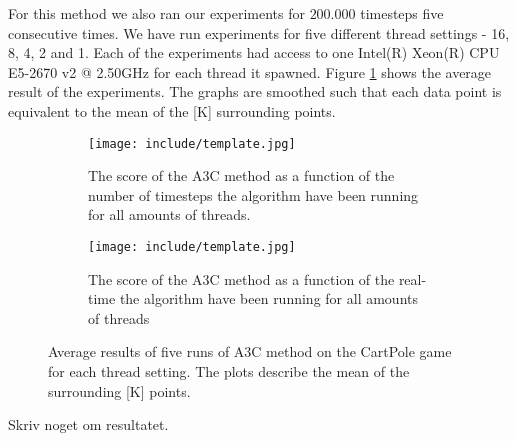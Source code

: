 \documentclass[11pt]{article}
\begin{document}
For this method we also ran our experiments for $200.000$ timesteps
five consecutive times.
We have run experiments for five different thread settings - 16, 8, 4, 2 and 1.
Each of the experiments had access to one Intel(R) Xeon(R) CPU E5-2670 v2 @ 2.50GHz for each thread it spawned.
Figure \ref{fig:a3c_cp_all} shows the average result of the experiments.
The graphs are smoothed such that each data point is equivalent to
the mean of the [K] surrounding points.

\begin{figure}[H]
    \begin{subfigure}{.5\textwidth}
        \centering
        \texttt{[image: include/template.jpg]}
        \caption{The score of the A3C method as a function
        of the number of timesteps the algorithm have been running for
        all amounts of threads.}
    \end{subfigure}
    \begin{subfigure}{.5\textwidth}
        \centering
        \texttt{[image: include/template.jpg]}
        \caption{The score of the A3C method as a function
        of the real-time the algorithm have been running for
        all amounts of threads}
    \end{subfigure}
    \caption{Average results of five runs of A3C method on the CartPole
        game for each thread setting. The plots describe the mean of
        the surrounding [K] points.}
     \label{fig:a3c_cp_all}
\end{figure}

Skriv noget om resultatet.
\end{document}
